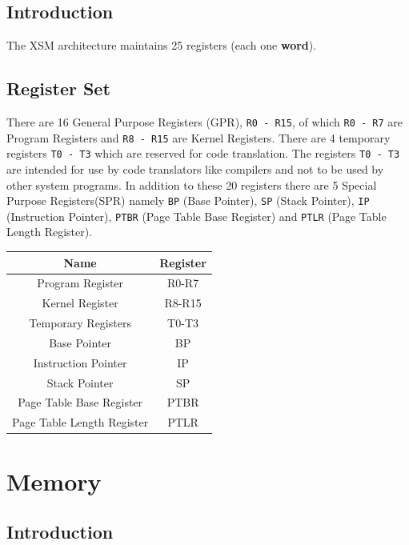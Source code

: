 \documentclass[11pt]{report}
\begin{document}
\section{Introduction}
The XSM architecture maintains 25 registers (each one \textbf{word}).

\section{Register Set}
There are 16 General Purpose Registers (GPR), \texttt{R0 - R15}, of which \texttt{R0 - R7} are Program Registers and \texttt{R8 - R15} are Kernel Registers. There are 4 temporary registers \texttt{T0 - T3} which are reserved for code translation. The registers \texttt{T0 - T3} are intended for use by code translators like compilers and not to be used by other system programs. In addition to these 20 registers there are 5 Special Purpose Registers(SPR) namely \texttt{BP} (Base Pointer), \texttt{SP} (Stack Pointer), \texttt{IP} (Instruction Pointer), \texttt{PTBR} (Page Table Base Register) and \texttt{PTLR} (Page Table Length Register).


\begin{center}
\begin{tabular}{|c|c|}
\hline Name & Register \\ 
\hline Program Register & R0-R7 \\ 
\hline Kernel Register & R8-R15 \\ 
\hline Temporary Registers & T0-T3 \\ 
\hline Base Pointer & BP \\ 
\hline Instruction Pointer & IP \\ 
\hline Stack Pointer & SP \\ 
\hline Page Table Base Register & PTBR \\
\hline Page Table Length Register & PTLR \\
\hline
\end{tabular} 
\end{center}


\chapter{Memory}
\label{sec:mem}

\section{Introduction}

\end{document}
